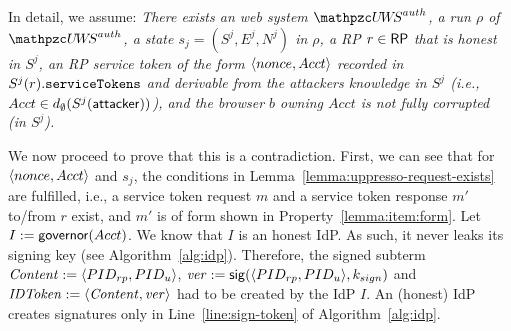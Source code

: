   
  In detail, we assume: \emph{There exists an \uppresso web 
  system $\uppressoauthwebsystem$, a run $\rho$ of 
  $\uppressoauthwebsystem$, a state $s_j = (S^j, E^j, N^j)$ 
  in $\rho$, a RP $r\in \mathsf{RP}$ that is honest in $S^j$, 
  an RP service token of the form $\langle {{}nonce, Acct} \rangle$
  recorded in $S^j(r).\mathtt{serviceTokens}$ and derivable from 
  the attackers knowledge in $S^j$ (i.e., $Acct \in
  d_{\emptyset}(S^j(\mathsf{attacker}))$), and the browser $b$ 
  owning $Acct$ is not fully corrupted (in $S^j$).}
  
  We now proceed to prove that this is a contradiction. 
  First, we can see that for $\langle nonce, Acct\rangle$ and $s_j$, 
  the conditions in Lemma~\ref{lemma:uppresso-request-exists} 
  are fulfilled, i.e., a service token request $m$ and a 
  service token response $m'$ to/from $r$ exist, and $m'$ is 
  of form shown in Property~\ref{lemma:item:form}.
  Let $I := \mathsf{governor}(Acct)$. 
  We know that $I$ is an honest IdP.
  As such, it never leaks its signing key (see Algorithm~\ref{alg:idp}). 
  Therefore, the signed subterm $\mathit{Content} := 
  \langle {{}PID_{rp}, PID_u} \rangle$, 
  $\mathit{ver} := \mathsf{sig}({\langle PID_{rp},PID_u\rangle},{k_{sign}})$ and 
  $\mathit{IDToken} := \langle {{}\mathit{Content}, \mathit{ver}} \rangle$ had to be 
  created by the IdP $I$. An (honest) IdP creates signatures 
  only in Line~\ref{line:sign-token} of Algorithm~\ref{alg:idp}.
  
